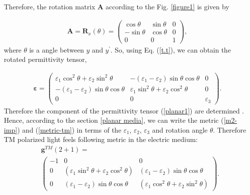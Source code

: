 \documentclass[9pt,twocolumn,twoside]{osajnl}
\begin{document}
Therefore, the rotation matrix $\mathbf{A}$ according to the Fig. \ref{figure1} is given by
 
\begin{align}\label{r.m}
        \mathbf{A}=\mathbf{R}_{x}(\theta)=
        \begin{pmatrix}            
            \cos{\theta} &\sin{\theta}&0 \\
            -\sin{\theta} & \cos{\theta}&0\\
            0&0&1
        \end{pmatrix},
\end{align}
where $\theta$ is a angle between $y$ and $y^{\prime}$.  So, using Eq. (\ref{t.t}),  we can obtain the rotated permittivity tensor,

\begin{align}\label{eps}
        \boldsymbol{\varepsilon}=
        \begin{pmatrix}             
            \varepsilon_{1} \cos^{2}{\theta} + \varepsilon_{2}\sin^{2}{\theta}   &-(\varepsilon_{1}-\varepsilon_{2})\sin{\theta}\cos{\theta} &0\\
            -(\varepsilon_{1}-\varepsilon_{2})\sin{\theta}\cos{\theta} &\varepsilon_{1} \sin^{2}{\theta} + \varepsilon_{2}\cos^{2}{\theta}&0\\
     0 &0 &\varepsilon_{3}
        \end{pmatrix}.
\end{align}
Therefore the component of the permittivity tensor (\ref{planar1}) are determined .
Hence, according to the section \ref{planar media}, we can write the metric (\ref{m2-imp}) and (\ref{metric-tm}) in terms of the  $\varepsilon_{1}$, $\varepsilon_{2}$, $\varepsilon_{3}$ and rotation angle $\theta$. Therefore TM polarized light feels following metric in the electric medium:
\begin{align}\label{t-metric}
&\mathbf{g}^{TM}(2+1)= \nonumber \\
&\begin{pmatrix}
-1&0&0\\
0&(\varepsilon_{1} \sin^{2}{\theta} +\varepsilon_{2}\cos^{2}{\theta})& (\varepsilon_{1}-\varepsilon_{2})\sin{\theta} \cos{\theta}\\
0&(\varepsilon_{1}-\varepsilon_{2})\sin{\theta} \cos{\theta}&(\varepsilon_{1} \cos^2{\theta} +\varepsilon_{2}\sin^{2}{\theta})
\end{pmatrix}.
\end{align}
\end{document}
